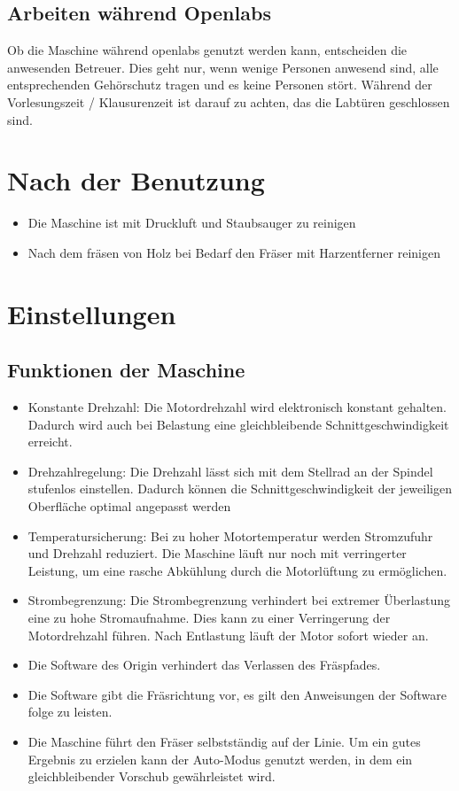 \documentclass{\basedir/fablab-document}
\begin{document}
\subsection{Arbeiten während Openlabs}
Ob die Maschine während openlabs genutzt werden kann, entscheiden die anwesenden
Betreuer. Dies geht nur, wenn wenige Personen anwesend sind, alle
entsprechenden Gehörschutz tragen und es keine Personen stört.
Während der Vorlesungszeit / Klausurenzeit ist darauf zu achten,
das die Labtüren geschlossen sind.

\section{Nach der Benutzung}
\begin{itemize}
\item Die Maschine ist mit Druckluft und Staubsauger zu reinigen
\item Nach dem fräsen von Holz bei Bedarf den Fräser mit Harzentferner reinigen
\end{itemize}

\section{Einstellungen}
\subsection{Funktionen der Maschine}
\begin{itemize}
    \item Konstante Drehzahl: Die Motordrehzahl wird elektronisch konstant gehalten.
        Dadurch wird auch bei Belastung eine gleichbleibende Schnittgeschwindigkeit erreicht.
    \item Drehzahlregelung: Die Drehzahl lässt sich mit dem Stellrad an der Spindel
        stufenlos einstellen. Dadurch können die Schnittgeschwindigkeit der jeweiligen
        Oberfläche optimal angepasst werden
    \item Temperatursicherung: Bei zu hoher Motortemperatur werden Stromzufuhr
        und Drehzahl reduziert. Die Maschine läuft nur noch mit verringerter
        Leistung, um eine rasche Abkühlung durch die Motorlüftung zu ermöglichen.
    \item Strombegrenzung: Die Strombegrenzung verhindert bei extremer Überlastung
        eine zu hohe Stromaufnahme. Dies kann zu einer Verringerung der Motordrehzahl
        führen. Nach Entlastung läuft der Motor sofort wieder an.
    \item Die Software des Origin verhindert das Verlassen des Fräspfades.
    \item Die Software gibt die Fräsrichtung vor, es gilt den Anweisungen der Software folge zu leisten.
    \item Die Maschine führt den Fräser selbstständig auf der Linie. Um ein
        gutes Ergebnis zu erzielen kann der Auto-Modus genutzt werden, in dem ein
        gleichbleibender Vorschub gewährleistet wird.
\end{itemize}
\end{document}
